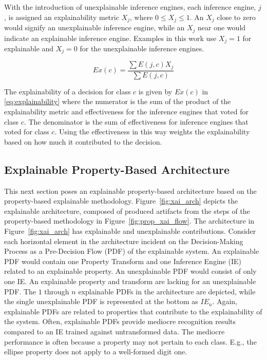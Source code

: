 With the introduction of unexplainable inference engines, each inference engine,
$j$, is assigned an explainability metric $X_j$, where $ 0 \leq X_j \leq 1$. An
$X_j$ close to zero would signify an unexplainable inference engine, while an
$X_j$ near one would indicate an explainable inference engine. Examples in this
work use $X_j=1$ for explainable and $X_j=0$ for the unexplainable inference
engines.

\begin{equation}\label{eq:explainability}
Ex(c)=\frac{\sum{E(j,c)X_j}}{\sum{E(j,c)}}
\end{equation}

The explainability of a decision for class $c$ is given by $Ex(c)$ in
\eqref{eq:explainability} where the numerator is the sum of the product of the
explainability metric and effectiveness for the inference engines that voted for
class $c$. The denominator is the sum of effectiveness for inference engines
that voted for class $c$. Using the effectiveness in this way weights the
explainability based on how much it contributed to the decision.

\subsection{Explainable Property-Based Architecture}

This next section poses an explainable property-based architecture based on the
property-based explainable methodology. Figure~\ref{fig:xai_arch} depicts the
explainable architecture, composed of produced artifacts from the steps of the
property-based methodology in Figure~\ref{fig:prop_xai_flow}. The architecture
in Figure~\ref{fig:xai_arch} has explainable and unexplainable contributions.
Consider each horizontal element in the architecture incident on the
Decision-Making Process as a Pre-Decision Flow (PDF) of the explainable system.
An explainable PDF would contain one Property Transform and one Inference Engine
(IE) related to an explainable property. An unexplainable PDF would consist of
only one IE.  An explainable property and transform are lacking for an
unexplainable PDF. The $1$ through $n$ explainable PDFs in the architecture are
depicted, while the single unexplainable PDF is represented at the bottom
as $IE_u$. Again, explainable PDFs are related to properties that contribute to
the explainability of the system. Often, explainable PDFs provide mediocre
recognition results compared to an IE trained against untransformed data. The
mediocre performance is often because a property may not pertain to each class.
E.g., the ellipse property does not apply to a well-formed digit one.

